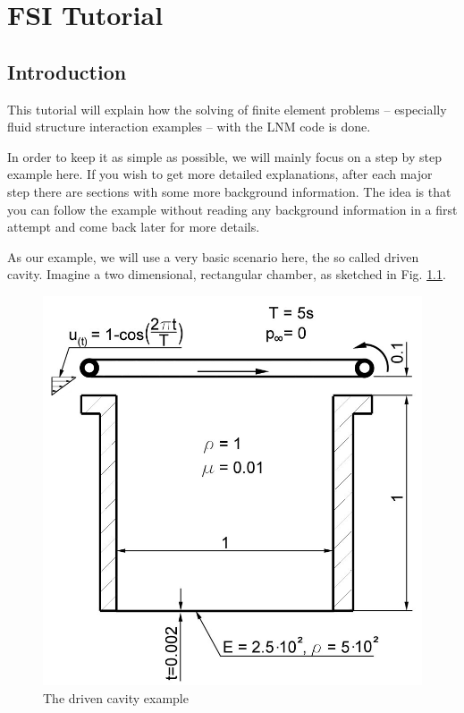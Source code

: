 \chapter{FSI Tutorial}
\label{tut_fsi:chap}

\section{Introduction}

This tutorial will explain how the solving of finite element problems
-- especially fluid structure interaction examples -- with the LNM
code is done.

In order to keep it as simple as possible, we will mainly focus on
a step by step example here. If you wish to get more detailed explanations,
after each major step there are sections with some more background
information. The idea is that you can follow the example without 
reading any background information in a first attempt and come back
later for more details.

As our example, we will use a very basic scenario here, the so called
driven cavity. Imagine a two dimensional, rectangular chamber, as
sketched in Fig. \ref{tut_fsi:1.1}.


\begin{figure}[h]
\hfil\includegraphics[scale=0.2]{Bilder/Angabeskizze}

\caption{\label{tut_fsi:1.1} The driven cavity example}
\end{figure}


